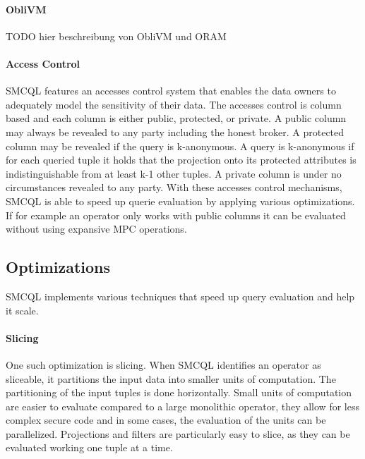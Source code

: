 \paragraph{ObliVM}
TODO hier beschreibung von ObliVM und ORAM 
\label{Accesses_label}	
\paragraph{Access Control}
SMCQL features an accesses control system that enables the data owners to adequately model the sensitivity of their data. 
The accesses control is column based and each column is either public, protected, or private. 
A public column may always be revealed to any party including the honest broker. A protected column may be revealed if the query is k-anonymous. A query is k-anonymous if for each queried tuple it holds that the projection onto its protected attributes is indistinguishable from at least k-1 other tuples. A private column is under no circumstances revealed to any party. With these accesses control mechanisms, SMCQL is able to speed up querie evaluation by applying various optimizations. If for example an operator only works with public columns it can be evaluated without using expansive MPC operations.


\label{sec:Optimizations_smcql}
\subsection{Optimizations}
SMCQL implements various techniques that speed up query evaluation and help it scale. 
\paragraph{Slicing}
One such optimization is slicing. When SMCQL identifies an operator as sliceable, it partitions the input data into smaller units of computation. The partitioning of the input tuples is done horizontally. Small units of computation are easier to evaluate compared to a large monolithic operator, they allow for less complex secure code and in some cases, the evaluation of the units can be parallelized. Projections and filters are particularly easy to slice, as they can be evaluated working one tuple at a time.
